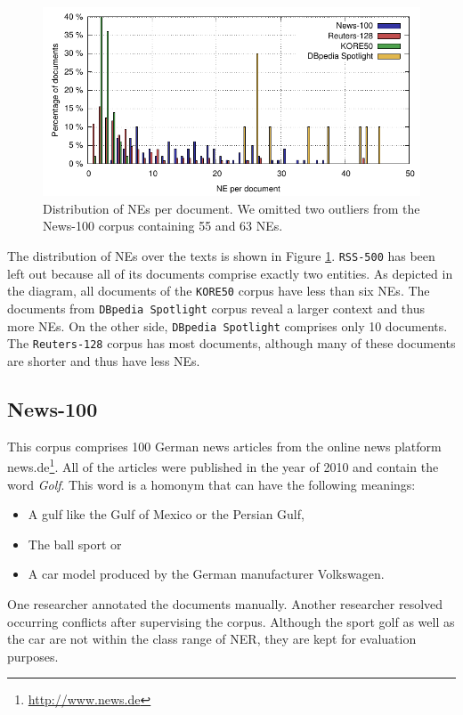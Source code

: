 \begin{figure}[htb!]
  \centering
  \includegraphics[width=\linewidth]{part_02/benchmarking/LREC_N3NIFNERNED/NE_per_doc.pdf}
  \caption{Distribution of NEs per document. We omitted two outliers from the News-100 corpus containing 55 and 63 NEs.}
  \label{n3:fig:nePerDoc}
\end{figure}
The distribution of NEs over the texts is shown in Figure \ref{n3:fig:nePerDoc}. 
\texttt{RSS-500} has been left out because all of its documents comprise exactly two entities. 
As depicted in the diagram, all documents of the \texttt{KORE50} corpus have less than six NEs. 
The documents from \texttt{DBpedia Spotlight} corpus reveal a larger context and thus more NEs. 
On the other side, \texttt{DBpedia Spotlight} comprises only 10 documents.
The \texttt{Reuters-128} corpus has most documents, although many of these documents are shorter and thus have less NEs.



\subsection{News-100}

This corpus comprises 100 German news articles from the online news platform news.de\footnote{\url{http://www.news.de}}. 
All of the articles were published in the year of 2010 and contain the word \emph{Golf}.
This word is a homonym that can have the following meanings:
\begin{itemize}
\item A gulf like the Gulf of Mexico or the Persian Gulf,
\item The ball sport or
\item A car model produced by the German manufacturer Volkswagen.
\end{itemize}

One researcher annotated the documents manually.
Another researcher resolved occurring conflicts after supervising the corpus.
Although the sport golf as well as the car are not within the class range of NER, they are kept for evaluation purposes.


